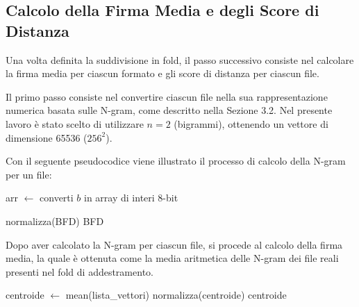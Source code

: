\documentclass{report}
\begin{document}
\subsection{Calcolo della Firma Media e degli Score di Distanza}

Una volta definita la suddivisione in fold, il passo successivo consiste nel calcolare la firma media per ciascun formato
e gli score di distanza per ciascun file.

\bigskip

Il primo passo consiste nel convertire ciascun file nella sua rappresentazione numerica basata sulle N-gram, come descritto nella Sezione 3.2.
Nel presente lavoro è stato scelto di utilizzare $n=2$ (bigrammi), ottenendo un vettore di dimensione 65536 ($256^2$).

\bigskip

Con il seguente pseudocodice viene illustrato il processo di calcolo della N-gram per un file:


\begin{algorithm}[H]
\caption{BFD-2gram}


arr $\gets$ converti $b$ in array di interi 8-bit\;


normalizza(BFD)\;
\Return BFD\;
\end{algorithm}


\bigskip

Dopo aver calcolato la N-gram per ciascun file, si procede al calcolo della firma media, la quale è ottenuta
come la media aritmetica delle N-gram dei file reali presenti nel fold di addestramento.

\bigskip

\begin{algorithm}[H]
\caption{CalcoloCentroide}


centroide $\gets$ mean(lista\_vettori)\;
normalizza(centroide)\;
\Return centroide\;
\end{algorithm}


\bigskip
\end{document}
